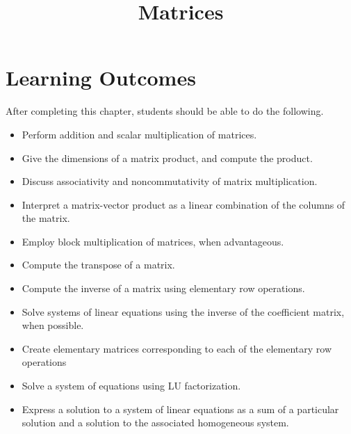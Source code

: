 \documentclass{ximera}
\title{Matrices}
\begin{document}
\begin{abstract}

\end{abstract}
 
\maketitle
 
\section*{Learning Outcomes}
After completing this chapter, students should be able to do the following.
 
\begin{itemize}
    \item Perform addition and scalar multiplication of matrices.
    \item Give the dimensions of a matrix product, and compute the product.
    \item Discuss associativity and noncommutativity of matrix multiplication.
    \item  Interpret a matrix-vector product as a linear combination of the columns of the matrix.
    \item Employ block multiplication of matrices, when advantageous.
    \item Compute the transpose of a matrix.
    \item Compute the inverse of a matrix using elementary row operations.
    \item  Solve systems of linear equations using the inverse of the coefficient matrix, when possible.
    \item Create elementary matrices corresponding to each of the elementary row operations    
    \item Solve a system of equations using LU factorization.
\item Express a solution to a system of linear equations as a sum of a particular solution and a solution to the associated homogeneous system.
 
\end{itemize}

 
\end{document}
